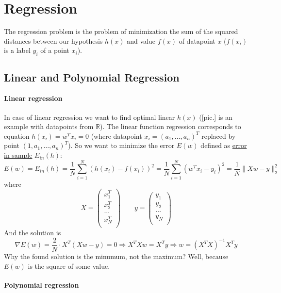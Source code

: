 \chapter{Regression}

{\sf The regression problem is the problem of minimization the sum of the squared distances between our hypothesis $h(x)$ and value $f(x)$ of datapoint $x$ ($f(x_i)$ is a label $y_i$ of a point $x_i$).}

\section{Linear and Polynomial Regression}
\vspace{-0.6cm}
\subsubsection*{Linear regression}

In case of linear regression we want to find optimal linear $h(x)$ ([pic.] is an example with datapoints from $\mathbb{R}$). The linear function regression corresponds to equation $h(x_i)=w^Tx_i=0$ (where datapoint $x_i=(a_1,\ldots,a_n)^T$ replaced by point $(1, a_1,\ldots,a_n)^T$). So we want to minimize the error $E(w)$ defined as \hyperlink{ein_and_eout}{error in sample} $E_{in}(h)$:
$$E(w)=E_{in}(h)=\frac{1}{N}\sum\limits_{i=1}^{N}(h(x_i)-f(x_i))^2=\frac{1}{N}\sum\limits_{i=1}^{N}(w^Tx_i-y_i)^2=\frac{1}{N}\|Xw-y\|_2^2$$
where
$$X=\begin{pmatrix}
	x_1^T \\
	x_2^T \\
	\ldots \\
	x_N^T \\
	\end{pmatrix} \qquad
	y=\begin{pmatrix}
	y_1 \\
	y_2 \\
	\ldots \\
	y_N \\
	\end{pmatrix}$$
And the solution is
$$\nabla E(w)=\frac{2}{N}\cdot X^T(Xw-y)=0\Rightarrow X^TXw=X^Ty\Rightarrow w=(X^TX)^{-1}X^Ty$$
Why the found solution is the minumum, not the maximum? Well, because $E(w)$ is the square of some value.

\subsubsection*{Polynomial regression}

